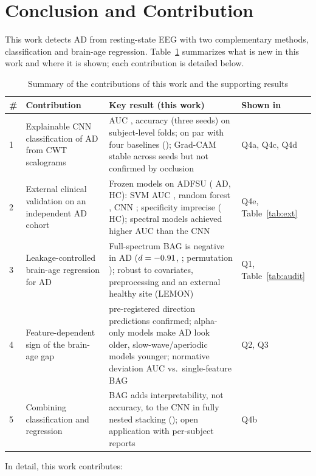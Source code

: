 \documentclass[journal]{IEEEtran}
\begin{document}
\section{Conclusion and Contribution}
This work detects AD from resting-state EEG with two complementary methods, classification and brain-age regression. Table~\ref{tab:contrib} summarizes what is new in this work and where it is shown; each contribution is detailed below.

\begin{table}[!t]
\centering
\caption{Summary of the contributions of this work and the supporting results}
\label{tab:contrib}
\footnotesize
\begin{tabular}{p{0.4cm}p{4.2cm}p{9.4cm}l}
\toprule
\# & Contribution & Key result (this work) & Shown in \\
\midrule
1 & Explainable CNN classification of AD from CWT scalograms & AUC \cnnAUC{}, accuracy \cnnAcc{} (three seeds) on subject-level folds; on par with four baselines (\holmText{}); Grad-CAM stable across seeds but not confirmed by occlusion & Q4a, Q4c, Q4d \\
2 & External clinical validation on an independent AD cohort & Frozen models on ADFSU (\extNad{} AD, \extNhc{} HC): SVM AUC \extFrozenSvmAUC{}, random forest \extFrozenRfAUC{}, CNN \extFrozenCnnAUC{}; specificity imprecise (\extNhc{} HC); spectral models achieved higher AUC than the CNN & Q4e, Table~\ref{tab:ext} \\
3 & Leakage-controlled brain-age regression for AD & Full-spectrum BAG is negative in AD ($d=-0.91{}$, \bagDci{}; permutation \bagPermP{}); robust to covariates, preprocessing and an external healthy site (LEMON) & Q1, Table~\ref{tab:audit} \\
4 & Feature-dependent sign of the brain-age gap & \famAgree{} pre-registered direction predictions confirmed; alpha-only models make AD look older, slow-wave/aperiodic models younger; normative deviation AUC \normAUC{} vs.\ single-feature BAG \bagAUC{} & Q2, Q3 \\
5 & Combining classification and regression & BAG adds interpretability, not accuracy, to the CNN in fully nested stacking (\nestDiffP{}); open application with per-subject reports & Q4b \\
\bottomrule
\end{tabular}
\end{table}

In detail, this work contributes:
\end{document}
